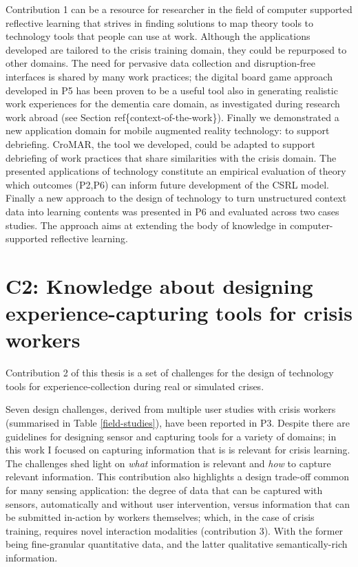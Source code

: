 Contribution 1 can be a resource for researcher in the field of computer
supported reflective learning that strives in finding solutions to map
theory tools to technology tools that people can use at work. Although
the applications developed are tailored to the crisis training domain,
they could be repurposed to other domains. The need for pervasive data
collection and disruption-free interfaces is shared by many work
practices; the digital board game approach developed in P5 has been
proven to be a useful tool also in generating realistic work experiences
for the dementia care domain, as investigated during research work
abroad (see Section ref\{context-of-the-work\}). Finally we demonstrated
a new application domain for mobile augmented reality technology: to
support debriefing. CroMAR, the tool we developed, could be adapted to
support debriefing of work practices that share similarities with the
crisis domain. The presented applications of technology constitute an
empirical evaluation of theory which outcomes (P2,P6) can inform future
development of the CSRL model. Finally a new approach to the design of
technology to turn unstructured context data into learning contents was
presented in P6 and evaluated across two cases studies. The approach
aims at extending the body of knowledge in computer-supported reflective
learning.

\section{C2: Knowledge about designing experience-capturing tools for
crisis
workers}\label{c2-knowledge-about-designing-experience-capturing-tools-for-crisis-workers}

Contribution 2 of this thesis is a set of challenges for the design of
technology tools for experience-collection during real or simulated
crises.

Seven design challenges, derived from multiple user studies with crisis
workers (summarised in Table \ref{field-studies}), have been reported in
P3. Despite there are guidelines for designing sensor and capturing
tools for a variety of domains; in this work I focused on capturing
information that is is relevant for crisis learning. The challenges shed
light on \emph{what} information is relevant and \emph{how} to capture
relevant information. This contribution also highlights a design
trade-off common for many sensing application: the degree of data that
can be captured with sensors, automatically and without user
intervention, versus information that can be submitted in-action by
workers themselves; which, in the case of crisis training, requires
novel interaction modalities (contribution 3). With the former being
fine-granular quantitative data, and the latter qualitative
semantically-rich information.

